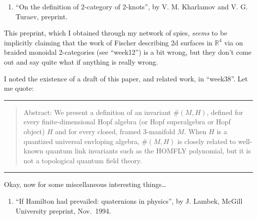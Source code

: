 \documentclass{article}
\def\tightlist{}
\renewcommand{\texttt}[1]{%
  \begingroup
  \ttfamily
  \begingroup\lccode`~=`/\lowercase{\endgroup\def~}{/\discretionary{}{}{}}%
  \begingroup\lccode`~=`[\lowercase{\endgroup\def~}{[\discretionary{}{}{}}%
  \begingroup\lccode`~=`.\lowercase{\endgroup\def~}{.\discretionary{}{}{}}%
  \catcode`/=\active\catcode`[=\active\catcode`.=\active
  \scantokens{#1\noexpand}%
  \endgroup
}
\begin{document}
\begin{enumerate}
\def\labelenumi{\arabic{enumi})}
\setcounter{enumi}{8}
\tightlist
\item
  ``On the definition of 2-category of 2-knots'', by V. M. Kharlamov and
  V. G. Turaev, preprint.
\end{enumerate}

This preprint, which I obtained through my network of spies,
\emph{seems} to be implicitly claiming that the work of Fischer
describing 2d surfaces in \(\mathbb{R}^4\) via on braided monoidal
2-categories (see ``week12'') is a bit wrong, but they don't come out
and say quite what if anything is really wrong.


I noted the existence of a draft of this paper, and related work, in
``week38''. Let me quote:

\begin{center}\rule{0.5\linewidth}{0.5pt}\end{center}

\begin{quote}
Abstract: We present a definition of an invariant \(\#(M,H)\), defined
for every finite-dimensional Hopf algebra (or Hopf superalgebra or Hopf
object) \(H\) and for every closed, framed 3-manifold \(M\). When \(H\)
is a quantized universal envloping algebra, \(\#(M,H)\) is closely
related to well-known quantum link invariants such as the HOMFLY
polynomial, but it is not a topological quantum field theory.
\end{quote}

\begin{center}\rule{0.5\linewidth}{0.5pt}\end{center}

Okay, now for some miscellaneous interesting things\ldots{}

\begin{enumerate}
\def\labelenumi{\arabic{enumi})}
\setcounter{enumi}{10}
\tightlist
\item
  ``If Hamilton had prevailed: quaternions in physics'', by J. Lambek,
  McGill University preprint, Nov.~1994.
\end{enumerate}
\end{document}
